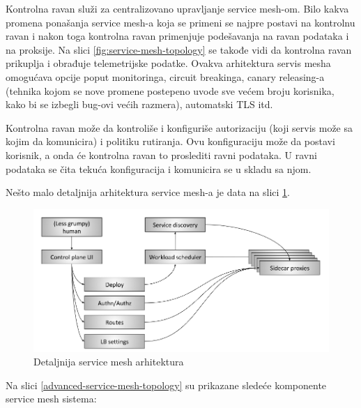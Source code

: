 \documentclass[a4paper,12pt]{report}
\begin{document}
Kontrolna ravan služi za centralizovano upravljanje service mesh-om. Bilo kakva promena ponašanja service mesh-a koja se primeni se najpre postavi na kontrolnu ravan i nakon toga kontrolna ravan primenjuje podešavanja na ravan podataka i na proksije. Na slici \ref{fig:service-mesh-topology} se takođe vidi da kontrolna ravan prikuplja i obrađuje telemetrijske podatke. Ovakva arhitektura servis mesha omogućava opcije poput monitoringa, circuit breakinga, canary releasing-a (tehnika kojom se nove promene postepeno uvode sve većem broju korisnika, kako bi se izbegli bug-ovi većih razmera), automatski TLS itd. \newline

Kontrolna ravan može da kontroliše i konfiguriše autorizaciju (koji servis može sa kojim da komunicira) i politiku rutiranja. Ovu konfiguraciju može da postavi korisnik, a onda će kontrolna ravan to proslediti ravni podataka. U ravni podataka se čita tekuća konfiguracija i komunicira se u skladu sa njom. \newline

Nešto malo detaljnija arhitektura service mesh-a je data na slici \ref{fig:advanced-service-mesh-topology}.

\begin{figure}[h]
    \centering
    \includegraphics[width=\textwidth]{advanced-service-mesh-architecture}
    \caption{Detaljnija service mesh arhitektura}
    \label{fig:advanced-service-mesh-topology}
\end{figure}

Na slici \ref{advanced-service-mesh-topology} su prikazane sledeće komponente service mesh sistema: 
\end{document}
